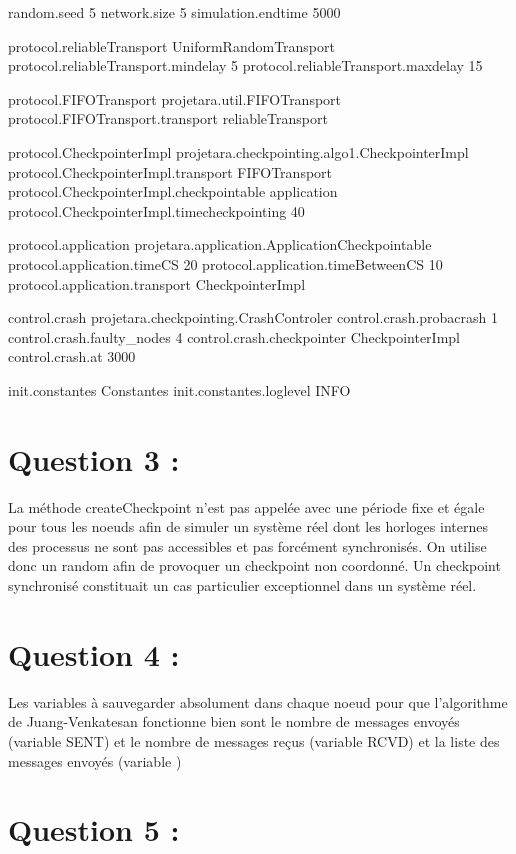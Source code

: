 \documentclass[11pt,a4paper]{report}
\begin{document}
random.seed 5
network.size 5
simulation.endtime 5000

protocol.reliableTransport UniformRandomTransport
protocol.reliableTransport.mindelay 5
protocol.reliableTransport.maxdelay 15

protocol.FIFOTransport projetara.util.FIFOTransport
protocol.FIFOTransport.transport reliableTransport

protocol.CheckpointerImpl projetara.checkpointing.algo1.CheckpointerImpl
protocol.CheckpointerImpl.transport FIFOTransport
protocol.CheckpointerImpl.checkpointable application
protocol.CheckpointerImpl.timecheckpointing 40

protocol.application projetara.application.ApplicationCheckpointable
protocol.application.timeCS 20
protocol.application.timeBetweenCS 10
protocol.application.transport CheckpointerImpl

control.crash projetara.checkpointing.CrashControler
control.crash.probacrash 1
control.crash.faulty_nodes 4
control.crash.checkpointer CheckpointerImpl
control.crash.at 3000

init.constantes Constantes
init.constantes.loglevel INFO


\section{Question 3 :}

La méthode createCheckpoint n'est pas appelée avec une période fixe et égale pour tous les noeuds afin de simuler un système réel dont les horloges internes des processus ne sont pas accessibles et pas forcément synchronisés. On utilise donc un random afin de provoquer un checkpoint non coordonné.
Un checkpoint synchronisé constituait un cas particulier exceptionnel dans un système réel.


\section{Question 4 :}

Les variables à sauvegarder absolument dans chaque noeud pour que l'algorithme de Juang-Venkatesan fonctionne bien sont le nombre de messages envoyés (variable SENT) et le nombre de messages reçus (variable RCVD) et la liste des messages envoyés (variable )


\section{Question 5 :}
\end{document}
